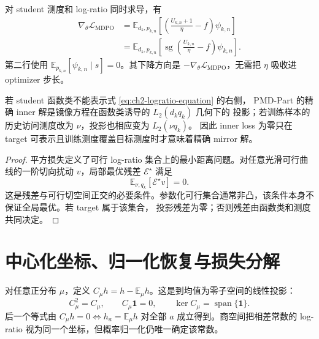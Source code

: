 \documentclass[lang=cn,scheme=chinese,openany]{../book/elegantbook}
\newcommand{\E}{\mathbb E}
\begin{document}
对 student 测度和 log-ratio 同时求导，有
\begin{align}
\nabla_\theta\mathcal L_{\mathrm{MDPO}}
&=\mathbb E_{d_k, p_{k,n}}\left[\left(\frac{U_{k,n}+1}\eta-f\right)\psi_{k,n}\right]\\
&=\mathbb E_{d_k, p_{k,n}}\left[\operatorname{sg}\!\left(\frac{U_{k,n}}\eta-f\right)\psi_{k,n}\right].
\label{eq:ch2-mdpo-gradient-bridge}
\end{align}
第二行使用 $\mathbb E_{ p_{k,n}}[\psi_{k,n}\mid s]=0$。其下降方向是 $-\nabla_\theta\mathcal L_{\mathrm{MDPO}}$，无需把 $\eta$ 吸收进 optimizer 步长。

\begin{proposition}[平方回归的投影含义]
\label{prop:ch2-regression-projection}
若 student 函数类不能表示式 \eqref{eq:ch2-logratio-equation} 的右侧，
PMD-Part 的精确 inner 解是镜像方程在函数类诱导的 $L_2(d_k q_k)$ 几何下的
投影；若训练样本的历史访问测度改为 $\nu$，投影也相应变为 $L_2(\nu q_k)$。
因此 inner loss 为零只在 target 可表示且训练测度覆盖目标测度时才意味着精确
mirror 解。
\end{proposition}

\begin{proof}
平方损失定义了可行 log-ratio 集合上的最小距离问题。对任意光滑可行曲线的一阶切向扰动 $v$，局部最优残差
$\mathscr E^\star$ 满足
\begin{equation*}
\mathbb E_{\nu, q_k}[\mathscr E^\star v]=0.
\end{equation*}
这是残差与可行切空间正交的必要条件。参数化可行集合通常非凸，该条件本身不保证全局最优。若 target 属于该集合，
投影残差为零；否则残差由函数类和测度共同决定。
\end{proof}



\section{中心化坐标、归一化恢复与损失分解}
\label{sec:inner-quotient}
对任意正分布 $\mu$，定义 $C_\mu h=h-\E_\mu h$。这是到均值为零子空间的线性投影：
\begin{equation}
C_\mu^2=C_\mu,\qquad C_\mu\mathbf1=0,\qquad
\ker C_\mu=\operatorname{span}\{\mathbf1\}.
\end{equation}
后一个等式由 $C_\mu h=0\Longleftrightarrow h_a=\E_\mu h$ 对全部 $a$ 成立得到。商空间把相差常数的 log-ratio 视为同一个坐标，但概率归一化仍唯一确定该常数。
\end{document}
